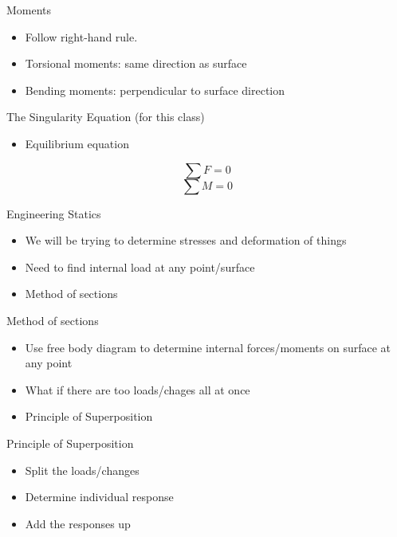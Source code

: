 \documentclass[10pt, svgnames]{beamer}
\begin{document}
\begin{frame}[label={sec:org9a573bd}]{Moments}
\begin{itemize}
\item Follow right-hand rule.

\item Torsional moments: same direction as surface

\item Bending moments: perpendicular to surface direction
\end{itemize}
\end{frame}

\begin{frame}[label={sec:org9236b00}]{The Singularity Equation (for this class)}
\begin{itemize}
\item Equilibrium equation
\end{itemize}

\[\sum F = 0\]
\[\sum M = 0\]
\end{frame}

\begin{frame}[label={sec:org7e46fb2}]{Engineering Statics}
\begin{itemize}
\item We will be trying to determine stresses and deformation of things

\item Need to find internal load at any point/surface

\item Method of sections
\end{itemize}
\end{frame}

\begin{frame}[label={sec:org17608de}]{Method of sections}
\begin{itemize}
\item Use free body diagram to determine internal forces/moments on surface
at any point

\item What if there are too loads/chages all at once

\item Principle of Superposition
\end{itemize}
\end{frame}

\begin{frame}[label={sec:org7e711b5}]{Principle of Superposition}
\begin{itemize}
\item Split the loads/changes

\item Determine individual response

\item Add the responses up
\end{itemize}
\end{frame}
\end{document}
